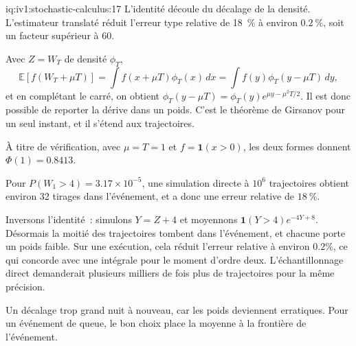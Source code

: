 \begin{solution}{iq:iv1:stochastic-calculus:17}
L'identité découle du décalage de la densité. L'estimateur translaté réduit l'erreur type relative de 18~\% à environ $0.2~\%$, soit un facteur supérieur à 60.

Avec $Z = W_T$ de densité $\phi_T$,
\[
\mathbb{E}[f(W_T + \mu T)] = \int f(x + \mu T)\phi_T(x)\,dx = \int f(y)\phi_T(y - \mu T)\,dy,
\]
et en complétant le carré, on obtient $\phi_T(y - \mu T) = \phi_T(y)e^{\mu y - \mu^2T/2}$. Il est donc possible de reporter la dérive dans un poids. C'est le théorème de Girsanov pour un seul instant, et il s'étend aux trajectoires.

À titre de vérification, avec $\mu = T = 1$ et $f = \mathbf{1}(x > 0)$, les deux formes donnent $\Phi(1) = 0.8413$.

Pour $P(W_1 > 4) = 3.17 \times 10^{-5}$, une simulation directe à $10^6$ trajectoires obtient environ 32 tirages dans l'événement, et a donc une erreur relative de $18~\%$.

Inversons l'identité~: simulons $Y = Z + 4$ et moyennons $\mathbf{1}(Y > 4)e^{-4Y + 8}$. Désormais la moitié des trajectoires tombent dans l'événement, et chacune porte un poids faible. Sur une exécution, cela réduit l'erreur relative à environ $0.2\%$, ce qui concorde avec une intégrale pour le moment d'ordre deux. L'échantillonnage direct demanderait plusieurs milliers de fois plus de trajectoires pour la même précision.

Un décalage trop grand nuit à nouveau, car les poids deviennent erratiques. Pour un événement de queue, le bon choix place la moyenne à la frontière de l'événement.



\end{solution}

